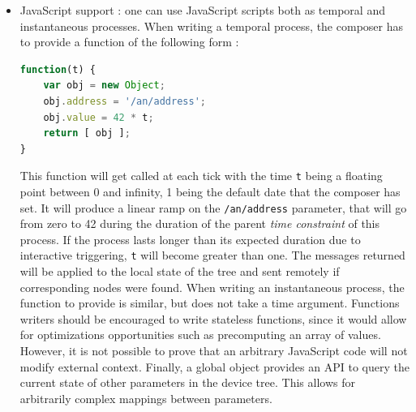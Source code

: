 \documentclass{article}
\newcommand{\timeconstraint}{\textit{time constraint}\xspace}
\begin{document}
\begin{itemize}
\item JavaScript support : one can use JavaScript scripts both as temporal and instantaneous processes.
When writing a temporal process, the composer has to provide a function of the following form : 
\begin{lstlisting}[language=JavaScript,basicstyle={\footnotesize\tt}]
function(t) {      
    var obj = new Object; 
    obj.address = '/an/address'; 
    obj.value = 42 * t; 
    return [ obj ];
}
\end{lstlisting}
This function will get called at each tick with the time \lstinline{t} being a floating point between 0 and infinity, 1 being the default date that the composer has set. 
It will produce a linear ramp on the \lstinline|/an/address| parameter, that will go from zero to 42 during the duration of the parent \timeconstraint of this process.
If the process lasts longer than its expected duration due to interactive triggering, \lstinline|t| will become greater than one.
The messages returned will be applied to the local state of the tree and sent remotely if corresponding nodes were found.
When writing an instantaneous process, the function to provide is similar, but does not take a time argument.
Functions writers should be encouraged to write stateless functions, since it would allow for optimizations opportunities such as precomputing an array of values. 
However, it is not possible to prove that an arbitrary JavaScript code will not modify external context.
Finally, a global object provides an API to query the current state of other parameters in the device tree.
This allows for arbitrarily complex mappings between parameters.


\end{itemize}
\end{document}
